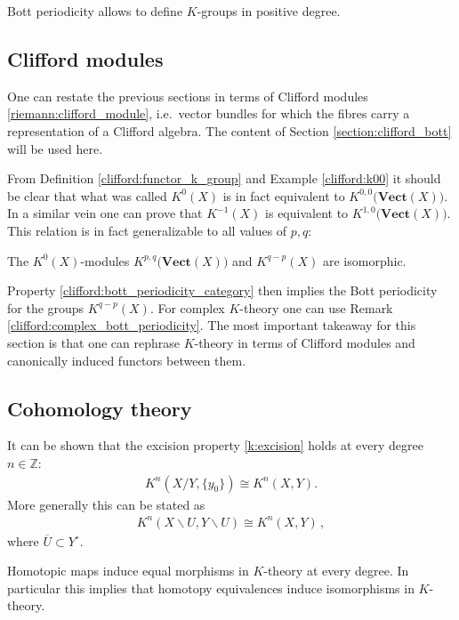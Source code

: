 {    \begin{remark}
        Bott periodicity allows to define $K$-groups in positive degree.
    \end{remark}

\subsection{Clifford modules}

    One can restate the previous sections in terms of Clifford modules \ref{riemann:clifford_module}, i.e.~vector bundles for which the fibres carry a representation of a Clifford algebra. The content of Section \ref{section:clifford_bott} will be used here.

    From Definition \ref{clifford:functor_k_group} and Example \ref{clifford:k00} it should be clear that what was called $K^0(X)$ is in fact equivalent to $K^{0,0}\big(\mathbf{Vect}(X)\big)$. In a similar vein one can prove that $K^{-1}(X)$ is equivalent to $K^{1,0}\big(\mathbf{Vect}(X)\big)$. This relation is in fact generalizable to all values of $p,q$:
    \begin{property}
        The $K^0(X)$-modules $K^{p,q}\big(\mathbf{Vect}(X)\big)$ and $K^{q-p}(X)$ are isomorphic.
    \end{property}

    Property \ref{clifford:bott_periodicity_category} then implies the Bott periodicity for the groups $K^{q-p}(X)$. For complex $K$-theory one can use Remark \ref{clifford:complex_bott_periodicity}. The most important takeaway for this section is that one can rephrase $K$-theory in terms of Clifford modules and canonically induced functors between them.

\subsection{Cohomology theory}

    \begin{property}[Excision]
        It can be shown that the excision property \ref{k:excision} holds at every degree $n\in\mathbb{Z}$:
        \begin{gather}
            K^n(X/Y,\{y_0\})\cong K^n(X,Y).
        \end{gather}
        More generally this can be stated as
        \begin{gather}
            K^n(X\backslash U,Y\backslash U)\cong K^n(X,Y)\,,
        \end{gather}
        where $\overline{U}\subset Y^\circ$.
    \end{property}
    \begin{property}
        Homotopic maps induce equal morphisms in $K$-theory at every degree. In particular this implies that homotopy equivalences induce isomorphisms in $K$-theory.
    \end{property}

}
